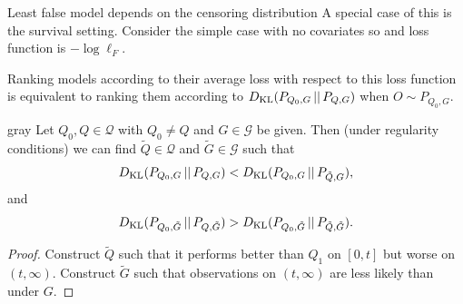 \documentclass[smaller]{beamer}\usepackage{listings}
\begin{document}
\begin{frame}[label={sec:org30ce482}]{Least false model depends on the censoring distribution}
\small A special case of this is the survival setting. Consider the simple case with no covariates
so and loss function is \(-\log\ell_F\).

\vfill

Ranking models according to their average loss with respect to this loss function is equivalent to
ranking them according to \(D_{\mathrm{KL}}(P_{Q_0, G} \, || \, P_{Q, G})\) when \(O \sim P_{Q_0, G}\).

\vfill


\begin{beamercolorbox}[rounded=true]{gray}
Let $Q_0, Q \in \mathcal{Q}$ with $Q_0 \not = Q$ and $G \in \mathcal{G}$ be given. Then (under
regularity conditions) we can find $\tilde Q \in \mathcal{Q}$ and $\tilde G \in \mathcal{G}$ such
that
\begin{equation*}
  D_{\mathrm{KL}}(P_{Q_0, G} \, || \, P_{Q, G}) < D_{\mathrm{KL}}(P_{Q_0, G} \, || \, P_{\tilde Q, G}),
\end{equation*}
and
\begin{equation*}
  D_{\mathrm{KL}}(P_{Q_0, \tilde G} \, || \, P_{Q, \tilde G}) > D_{\mathrm{KL}}(P_{Q_0, \tilde G} \, || \, P_{\tilde Q,
    \tilde G}).
\end{equation*}
\end{beamercolorbox}


\begin{proof}[Proof]
Construct \(\tilde Q\) such that it performs better than \(Q_1\) on \([0, t]\) but worse on \((t, \infty)\).
Construct \(\tilde G\) such that observations on \((t, \infty)\) are less likely than under \(G\).
\end{proof}
\end{frame}
\end{document}
